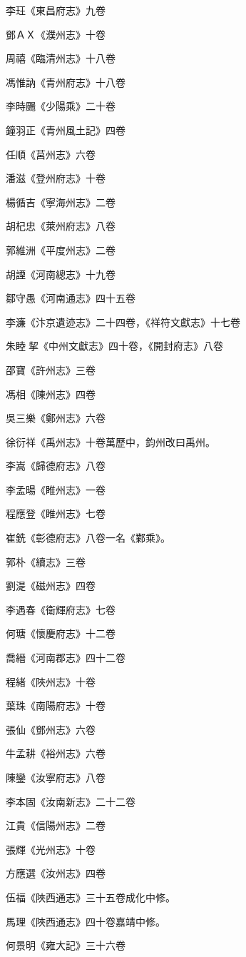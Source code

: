 李玨《東昌府志》九卷

鄧ＡＸ《濮州志》十卷

周禧《臨清州志》十八卷

馮惟訥《青州府志》十八卷

李時颺《少陽乘》二十卷

鐘羽正《青州風土記》四卷

任順《莒州志》六卷

潘滋《登州府志》十卷

楊循吉《寧海州志》二卷

胡杞忠《萊州府志》八卷

郭維洲《平度州志》二卷

胡諲《河南總志》十九卷

鄒守愚《河南通志》四十五卷

李濂《汴京遺迹志》二十四卷，《祥符文獻志》十七卷

朱睦挈《中州文獻志》四十卷，《開封府志》八卷

邵寶《許州志》三卷

馮相《陳州志》四卷

吳三樂《鄭州志》六卷

徐衍祥《禹州志》十卷萬歷中，鈞州改曰禹州。

李嵩《歸德府志》八卷

李孟暘《睢州志》一卷

程應登《睢州志》七卷

崔銑《彰德府志》八卷一名《鄴乘》。

郭朴《續志》三卷

劉湜《磁州志》四卷

李遇春《衛輝府志》七卷

何瑭《懷慶府志》十二卷

喬縉《河南郡志》四十二卷

程緒《陜州志》十卷

葉珠《南陽府志》十卷

張仙《鄧州志》六卷

牛孟耕《裕州志》六卷

陳鑾《汝寧府志》八卷

李本固《汝南新志》二十二卷

江貴《信陽州志》二卷

張輝《光州志》十卷

方應選《汝州志》四卷

伍福《陜西通志》三十五卷成化中修。

馬理《陜西通志》四十卷嘉靖中修。

何景明《雍大記》三十六卷

